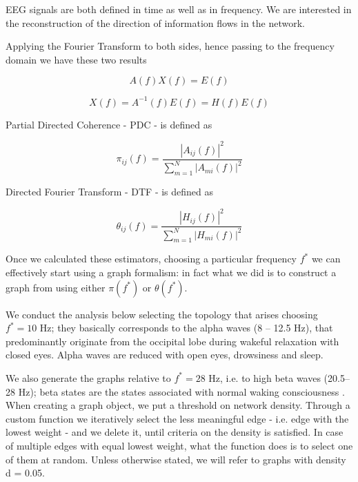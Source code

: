 \documentclass[%
 aip,
 jmp,%
 amsmath,amssymb,
 reprint,%
]{revtex4-1}
\begin{document}
EEG signals are both defined in time as well as in frequency. We are interested in the reconstruction of the direction of information flows in the network.

Applying the Fourier Transform to both sides, hence passing to the frequency domain we have these two results

\begin{equation}
A(f)X(f) = E(f)
\end{equation}

\begin{equation}
X(f) = A^{-1}(f)E(f) = H(f)E(f)
\end{equation}


Partial Directed Coherence - PDC - is defined as 

\begin{equation}
	\pi_{ij}(f) = \frac{|A_{ij}(f)|^2}{\sum_{m=1}^{N}|A_{mi}(f)|^2}
\end{equation}

Directed Fourier Transform - DTF - is defined as 

\begin{equation}
	\theta_{ij}(f) = \frac{|H_{ij}(f)|^2}{\sum_{m=1}^{N}|H_{mi}(f)|^2}
\end{equation}

Once we calculated these estimators, choosing a particular frequency $f^*$ we can effectively start using a graph formalism: in fact what we did is to construct a graph from using either $\pi(f^*)$ or $\theta(f^*)$.

We conduct the analysis below selecting the topology that arises choosing $f^* = \text{10 Hz}$; they basically corresponds to the alpha waves (8 – 12.5 Hz), that predominantly originate from the occipital lobe during wakeful relaxation with closed eyes. Alpha waves are reduced with open eyes, drowsiness and sleep\cite{alphaPalva}.

We also generate the graphs relative to $f^* = \text{28 Hz}$, i.e. to high beta waves (20.5–28 Hz); beta states are the states associated with normal waking consciousness \cite{betaWiki}.\\

When creating a graph object, we put a threshold on network density. Through a custom function we iteratively select the less meaningful edge - i.e. edge with the lowest weight - and we delete it, until criteria on the density is satisfied. In case of multiple edges with equal lowest weight, what the function does is to select one of them at random. Unless otherwise stated, we will refer to graphs with density d = 0.05.
\end{document}
